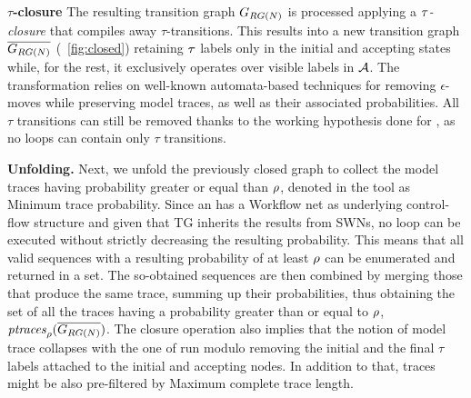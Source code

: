 \textbf{$\tau$-closure} The resulting transition graph $G_{RG(N)}$ is processed applying a \emph{$\tau$-closure} that compiles away
$\tau$-transitions. This results into a new transition graph $\overline{G_{RG(N)}}$ (\figurename~\ref{fig:closed}) %
retaining $\tau$ labels only in the initial and accepting states while, for the rest, it exclusively operates over visible labels in $\mathcal{A}$. %
The transformation relies on well-known automata-based techniques for removing $\epsilon$-moves while preserving model traces, as well as their associated probabilities. %
All $\tau$ transitions can still be removed thanks to the working hypothesis done for , as no loops can contain only $\tau$ transitions. %
\medskip

\textbf{Unfolding.} Next, we unfold the previously closed graph to collect the model traces having probability greater or equal than $\rho$, denoted in the tool as \textsf{Minimum trace probability}. %
Since an \uswn has a Workflow net as underlying control-flow structure and given that TG inherits the results from SWNs, no loop can be executed without strictly decreasing the resulting probability. This means that all valid sequences with a resulting probability of at least $\rho$ can be enumerated and returned in a set. The so-obtained sequences are then combined by merging those that produce the same trace, summing up their probabilities, thus obtaining the set of all the traces having a probability greater than or equal to $\rho$, $\mathit{ptraces}_{\rho}(\overline{G_{RG(N)}})$. The closure operation also implies that the notion of model trace collapses with the one of run modulo removing the initial and the final $\tau$ labels attached to the initial and accepting nodes. In addition to that, traces might be also pre-filtered by \textsf{Maximum complete trace length}. 
\medskip

